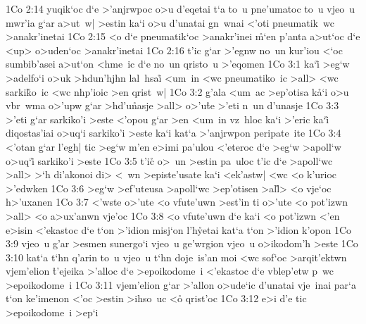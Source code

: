 \vs 1Co 2:14
yuqik`oc
d`e
>'anjrwpoc
o>u
d'eqetai
t`a
to~u
pne'umatoc
to~u
vjeo~u
mwr'ia
g`ar
a>ut~w|
>estin
ka`i
o>u
d'unatai
gn~wnai
<'oti
pneumatik~wc
>anakr'inetai\bibvsend
\vs 1Co 2:15
<o
d`e
pneumatik`oc
>anakr'inei
\r{m}`en
p'anta
a>ut`oc
d`e
<up>
o>uden`oc
>anakr'inetai\bibvsend
\vs 1Co 2:16
t'ic
g`ar
>'egnw
no~un
kur'iou
<`oc
sumbib'asei
a>ut`on
<hme~ic
d`e
no~un
qristo~u
>'eqomen\bibvsend
\vs 1Co 3:1
ka`i\r{}
>eg`w
>adelfo`i
o>uk
>hdun'hjhn
lal~hsai\r{}
<um~in
<wc
pneumatiko~ic
>all>
<wc
sarki\r{k}o~ic
<wc
nhp'ioic
>en
qrist~w|\bibvsend
\vs 1Co 3:2
g'ala
<um~ac
>ep'otisa
k\r{a}`i
o>u
vbr~wma
o>'upw
g`ar
>hd'u\r{n}asje
>all>
o>'u\r{t}e
>'eti
n~un
d'unasje\bibvsend
\vs 1Co 3:3
>'eti
g`ar
sarkiko'i
>este
<'opou
g`ar
>en
<um~in
vz~hloc
ka`i
>'eric
ka`i\r{}
diqostas'iai
o>uq`i
sarkiko'i
>este
ka`i
kat`a
>'anjrwpon
peripate~ite\bibvsend
\vs 1Co 3:4
<'otan
g`ar
l'egh|
tic
>eg`w
m'en
e>imi
pa'ulou
<'eteroc
d`e
>eg`w
>apoll`w
o>uq`i\r{}
sarkiko'i
>este\bibvsend
\vs 1Co 3:5
t'ic\r{}
o>~un
>estin
pa~uloc
t'ic
d`e
>apoll`wc
>all>
>`h
di'akonoi
di>
<~wn
>episte'usate
ka`i
<ek'astw|
<wc
<o
k'urioc
>'edwken\bibvsend
\vs 1Co 3:6
>eg`w
>ef'uteusa
>apoll`wc
>ep'otisen
>al\r{l}>
<o
vje`oc
h>'uxanen\bibvsend
\vs 1Co 3:7
<'wste
o>'ute
<o
vfute'uwn
>est'in
ti
o>'ute
<o
pot'izwn
>all>
<o
a>ux'anwn
vje'oc\bibvsend
\vs 1Co 3:8
<o
vfute'uwn
d`e
ka`i
<o
pot'izwn
<'en
e>isin
<'ekastoc
d`e
t`on
>'idion
misj`on
l'h\r{y}etai
kat`a
t`on
>'idion
k'opon\bibvsend
\vs 1Co 3:9
vjeo~u
g'ar
>esmen
sunergo`i
vjeo~u
ge'wrgion
vjeo~u
o>ikodom'h
>este\bibvsend
\vs 1Co 3:10
kat`a
t`hn
q'arin
to~u
vjeo~u
t`hn
doje~is'an
moi
<wc
sof`oc
>arqit'ektwn
vjem'elion
\r{t}'ejeika
>'alloc
d`e
>epoikodome~i
<'ekastoc
d`e
vblep'etw
p~wc
>epoikodome~i\bibvsend
\vs 1Co 3:11
vjem'elion
g`ar
>'allon
o>ude`ic
d'unatai
vje~inai
par`a
t`on
ke'imenon
<'oc
>estin
>ihso~uc
<o\r{}
qrist'oc\bibvsend
\vs 1Co 3:12
e>i
d'e
tic
>epoikodome~i
>ep`i
